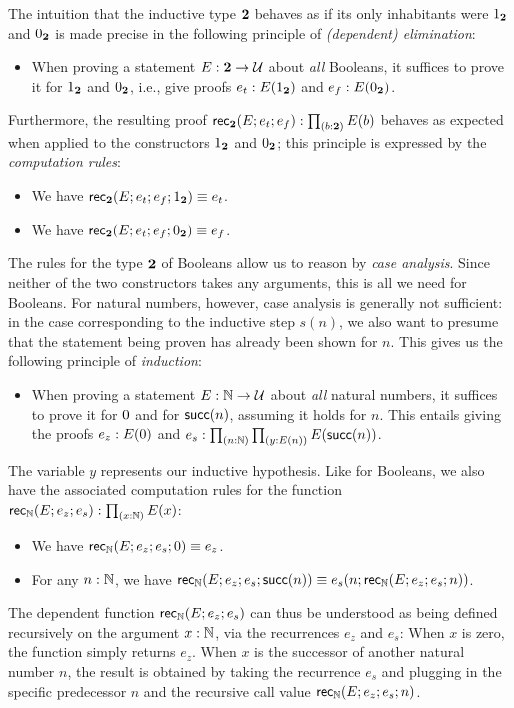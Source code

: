 The intuition that the inductive type $\mathbf{2}$ behaves as if its only inhabitants were $1_{\mathbf{2}}$ and $0_{\mathbf{2}}$ is made precise in the following principle of \emph{(dependent) elimination}:

\begin{itemize}
\item When proving a statement $E : \mathbf{2} \to \mathcal{U}$ about \emph{all} Booleans, it suffices to prove it for $1_{\mathbf{2}}$ and $0_{\mathbf{2}}$, i.e., give proofs
$ e_t : E(1_{\mathbf{2}})$ and $e_f : E(0_{\mathbf{2}})$.
\end{itemize}

Furthermore, the resulting proof $\rec\two(E;e_t;e_f): \prd{b : \two}E(b)$ behaves as expected when applied to the constructors $1_{\mathbf{2}}$ and $0_{\mathbf{2}}$; this principle is expressed by the \emph{computation rules}:
\begin{itemize}
\item We have $\mathsf{rec}_{\mathbf{2}}(E;e_t;e_f;1_{\mathbf{2}}) \equiv e_t$.
\item We have $\mathsf{rec}_{\mathbf{2}}(E;e_t;e_f;0_{\mathbf{2}}) \equiv e_f$.
\end{itemize}

The rules for the type $\mathbf{2}$ of Booleans allow us to reason by \emph{case analysis}. Since neither of the two constructors takes any arguments, this is all we need for Booleans. For natural numbers, however, case analysis is generally not sufficient: in the case corresponding to the inductive step $s(n)$, we also want to presume that the statement being proven has already been shown for $n$. This gives us the following principle of \emph{induction}: 
\begin{itemize}
\item When proving a statement $E : \mathbb{N} \to \mathcal{U}$ about \emph{all} natural numbers, it suffices to prove it for $0$ and for $\mathsf{succ}(n)$, assuming it holds
for $n$. This entails giving the proofs $e_z : E(0)$ and $e_s : \prd{n : \nat}{y : E(n)} E(\s(n))$.
\end{itemize}
The variable $y$ represents our inductive hypothesis. Like for Booleans, we also have the associated computation rules for the function $\rec\nat(E;e_z;e_s) : \prd{x:\nat} E(x)$:
\begin{itemize}
\item We have $\mathsf{rec}_{\mathbb{N}}(E;e_z;e_s;0) \equiv e_z$.
\item For any $n : \mathbb{N}$, we have $\mathsf{rec}_{\mathbb{N}}(E;e_z;e_s;\mathsf{succ}(n)) \equiv e_s(n;\mathsf{rec}_{\mathbb{N}}(E;e_z;e_s;n))$.
\end{itemize}
The dependent function $\mathsf{rec}_{\mathbb{N}}(E;e_z;e_s)$ can thus be understood as being defined recursively on the argument $x : \mathbb{N}$, via the recurrences $e_z$ and $e_s$: When $x$ is zero, the function simply returns $e_z$. When $x$ is the successor of another natural number $n$, the result is obtained by taking the recurrence $e_s$ and plugging in the specific predecessor $n$ and the recursive call value $\mathsf{rec}_{\mathbb{N}}(E;e_z;e_s;n)$.

